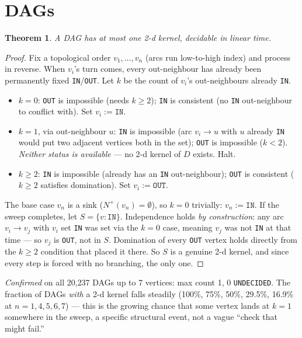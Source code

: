 \documentclass[11pt]{article}
\theoremstyle{plain}
\newtheorem{theorem}{Theorem}
\theoremstyle{definition}
\theoremstyle{remark}
\begin{document}
\section{DAGs}

\begin{theorem}
A DAG has at most one 2-d kernel, decidable in linear time.
\end{theorem}

\begin{proof}
Fix a topological order $v_1,\dots,v_n$ (arcs run low-to-high index) and process in
reverse. When $v_i$'s turn comes, every out-neighbour has already been permanently
fixed \texttt{IN}/\texttt{OUT}. Let $k$ be the count of $v_i$'s out-neighbours
already \texttt{IN}.
\begin{itemize}[nosep]
\item $k=0$: \texttt{OUT} is impossible (needs $k\ge2$); \texttt{IN} is consistent
(no \texttt{IN} out-neighbour to conflict with). Set $v_i:=\texttt{IN}$.
\item $k=1$, via out-neighbour $u$: \texttt{IN} is impossible (arc $v_i\to u$ with
$u$ already \texttt{IN} would put two adjacent vertices both in the set);
\texttt{OUT} is impossible ($k<2$). \emph{Neither status is available} — no
2-d kernel of $D$ exists. Halt.
\item $k\ge2$: \texttt{IN} is impossible (already has an \texttt{IN}
out-neighbour); \texttt{OUT} is consistent ($k\ge2$ satisfies domination). Set
$v_i:=\texttt{OUT}$.
\end{itemize}
The base case $v_n$ is a sink ($N^+(v_n)=\emptyset$), so $k=0$ trivially:
$v_n:=\texttt{IN}$. If the sweep completes, let $S=\{v:\texttt{IN}\}$. Independence
holds \emph{by construction}: any arc $v_i\to v_j$ with $v_i$ set \texttt{IN} was set
via the $k=0$ case, meaning $v_j$ was not \texttt{IN} at that time — so $v_j$ is
\texttt{OUT}, not in $S$. Domination of every \texttt{OUT} vertex holds directly from
the $k\ge2$ condition that placed it there. So $S$ is a genuine 2-d kernel, and since
every step is forced with no branching, the only one.
\end{proof}

\emph{Confirmed} on all 20{,}237 DAGs up to 7 vertices: max count 1, 0
\texttt{UNDECIDED}. The fraction of DAGs \emph{with} a 2-d kernel falls steadily
(100\%, 75\%, 50\%, 29.5\%, 16.9\% at $n=1,4,5,6,7$) — this is the growing chance
that some vertex lands at $k=1$ somewhere in the sweep, a specific structural event,
not a vague ``check that might fail.''
\end{document}
